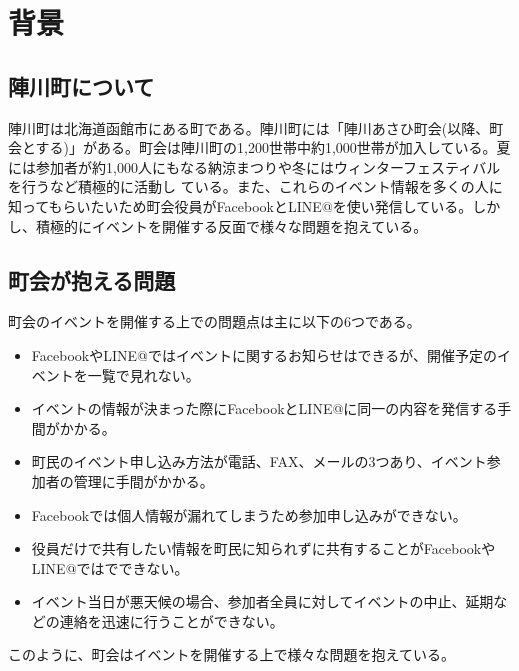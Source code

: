 \chapter{背景}

\section{陣川町について}
陣川町は北海道函館市にある町である。陣川町には「陣川あさひ町会(以降、町会とする)」がある。町会は陣川町の1,200世帯中約1,000世帯が加入している。夏には参加者が約1,000人にもなる納涼まつりや冬にはウィンターフェスティバルを行うなど積極的に活動し
ている。また、これらのイベント情報を多くの人に知ってもらいたいため町会役員がFacebookとLINE@を使い発信している。しかし、積極的にイベントを開催する反面で様々な問題を抱えている。

\section{町会が抱える問題}
町会のイベントを開催する上での問題点は主に以下の6つである。
\begin{itemize}
    \item FacebookやLINE@ではイベントに関するお知らせはできるが、開催予定のイベントを一覧で見れない。
    \item イベントの情報が決まった際にFacebookとLINE@に同一の内容を発信する手間がかかる。
    \item 町民のイベント申し込み方法が電話、FAX、メールの3つあり、イベント参加者の管理に手間がかかる。
    \item Facebookでは個人情報が漏れてしまうため参加申し込みができない。
    \item 役員だけで共有したい情報を町民に知られずに共有することがFacebookやLINE@ではでできない。
    \item イベント当日が悪天候の場合、参加者全員に対してイベントの中止、延期などの連絡を迅速に行うことができない。
\end{itemize}
このように、町会はイベントを開催する上で様々な問題を抱えている。
